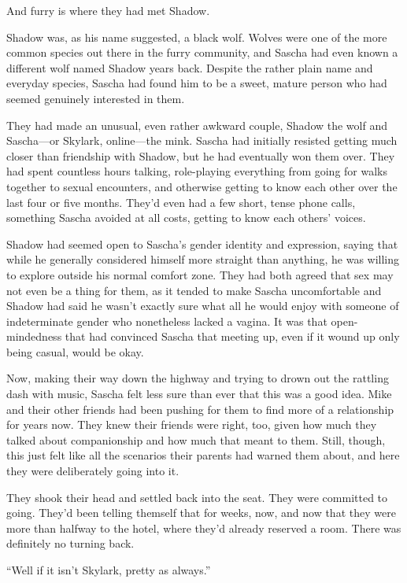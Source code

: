 And furry is where they had met Shadow.

Shadow was, as his name suggested, a black wolf. Wolves were one of the more common species out there in the furry community, and Sascha had even known a different wolf named Shadow years back. Despite the rather plain name and everyday species, Sascha had found him to be a sweet, mature person who had seemed genuinely interested in them.

They had made an unusual, even rather awkward couple, Shadow the wolf and Sascha---or Skylark, online---the mink. Sascha had initially resisted getting much closer than friendship with Shadow, but he had eventually won them over. They had spent countless hours talking, role-playing everything from going for walks together to sexual encounters, and otherwise getting to know each other over the last four or five months. They'd even had a few short, tense phone calls, something Sascha avoided at all costs, getting to know each others' voices.

Shadow had seemed open to Sascha's gender identity and expression, saying that while he generally considered himself more straight than anything, he was willing to explore outside his normal comfort zone. They had both agreed that sex may not even be a thing for them, as it tended to make Sascha uncomfortable and Shadow had said he wasn't exactly sure what all he would enjoy with someone of indeterminate gender who nonetheless lacked a vagina. It was that open-mindedness that had convinced Sascha that meeting up, even if it wound up only being casual, would be okay.

Now, making their way down the highway and trying to drown out the rattling dash with music, Sascha felt less sure than ever that this was a good idea. Mike and their other friends had been pushing for them to find more of a relationship for years now. They knew their friends were right, too, given how much they talked about companionship and how much that meant to them. Still, though, this just felt like all the scenarios their parents had warned them about, and here they were deliberately going into it.

They shook their head and settled back into the seat. They were committed to going. They'd been telling themself that for weeks, now, and now that they were more than halfway to the hotel, where they'd already reserved a room. There was definitely no turning back.

\secdiv{}

``Well if it isn't Skylark, pretty as always.''

